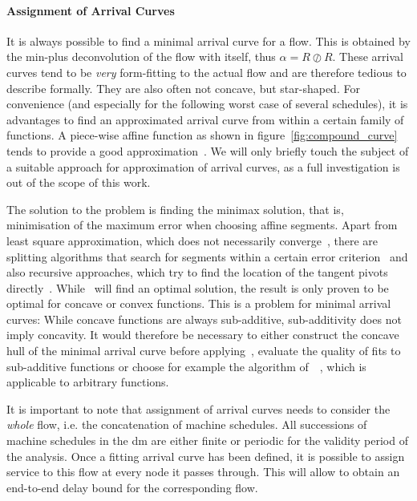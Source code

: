 \paragraph{Assignment of Arrival Curves}
It is always possible to find a minimal arrival curve for a flow. This is obtained by the min-plus deconvolution of the flow with itself, thus $\alpha = R \oslash R$.
These arrival curves tend to be \emph{very} form-fitting to the actual flow and are therefore tedious to describe formally. They are also often not concave, but star-shaped. For convenience (and especially for the following worst case of several schedules),
it is advantages to find an approximated arrival curve from within a certain family of functions. A piece-wise affine function as shown in figure~\ref{fig:compound_curve} tends to provide a good approximation~\cite[p. ]{thiran_network_2001}.
We will only briefly touch the subject of a suitable approach for approximation of arrival curves, as a full investigation is out of the scope of this work.
\par
The solution to the problem is finding the minimax solution, that is, minimisation of the maximum error when choosing affine segments. Apart from least square approximation, which does not necessarily converge~\cite{imamoto_recursive_2008},
there are splitting algorithms that search for segments within a certain error criterion~\cite{vandewalle_calculation_1975} and also recursive approaches, which try to find the location of the tangent pivots directly~\cite{imamoto_recursive_2008}.
While~\cite{imamoto_recursive_2008} will find an optimal solution, the result is only proven to be optimal for concave or convex functions.
This is a problem for minimal arrival curves: While concave functions are always sub-additive, sub-additivity does not imply concavity.
It would therefore be necessary to either construct the concave hull of the minimal arrival curve before applying~\cite{imamoto_recursive_2008}, evaluate the quality of fits to sub-additive functions or choose for example the algorithm of~\citeauthor{vandewalle_calculation_1975}~\cite{vandewalle_calculation_1975}, which is applicable to arbitrary functions.
\par
It is important to note that assignment of arrival curves needs to consider the \emph{whole} flow, i.e. the concatenation of machine schedules.
All successions of machine schedules in the \gls{dm} are either finite or periodic for the validity period of the analysis.
Once a fitting arrival curve has been defined, it is possible to assign service to this flow at every node it passes through.
This will allow to obtain an end-to-end delay bound for the corresponding flow.

